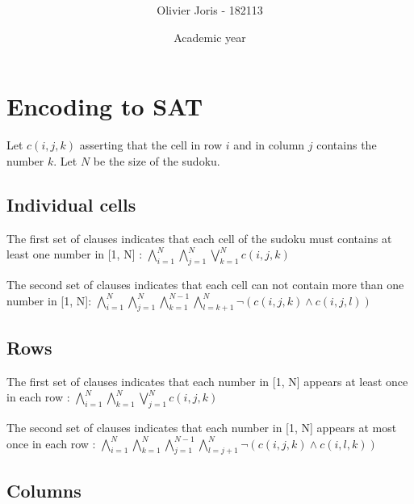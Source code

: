 \documentclass[a4paper, 11pt, oneside]{article}
\title{\ClassName\\\vspace*{0.8cm}\ProjectName\vspace{1cm}}
\author{Olivier Joris - 182113}
\date{\vspace{1cm}Academic year \AcademicYear}
\begin{document}
\begin{titlingpage}
{\let\newpage\relax\maketitle}
\end{titlingpage}

\thispagestyle{empty}
\newpage




\section{Encoding to SAT}

Let $c(i, j, k)$ asserting that the cell in row $i$ and in column $j$ contains the number $k$.
Let $N$ be the size of the sudoku.
\subsection{Individual cells}

The first set of clauses indicates that each cell of the sudoku must contains at least one number in [1, N] :
$\bigwedge_{i=1}^{N} \bigwedge_{j=1}^{N} \bigvee_{k=1}^{N} c(i, j, k)$

The second set of clauses indicates that each cell can not contain more than one number in [1, N]: $\bigwedge_{i=1}^{N} \bigwedge_{j=1}^{N} \bigwedge_{k=1}^{N-1} \bigwedge_{l=k+1}^{N} \neg (c(i, j, k) \land c(i,j,l))$

\subsection{Rows}

The first set of clauses indicates that each number in [1, N] appears at least once in each row :
$\bigwedge_{i=1}^{N} \bigwedge_{k=1}^{N} \bigvee_{j=1}^{N} c(i, j, k)$

The second set of clauses indicates that each number in [1, N] appears at most once in each row :
$\bigwedge_{i=1}^{N} \bigwedge_{k=1}^{N} \bigwedge_{j=1}^{N-1} \bigwedge_{l=j+1}^{N} \neg (c(i, j, k) \land c(i, l, k))$


\subsection{Columns}
\end{document}
